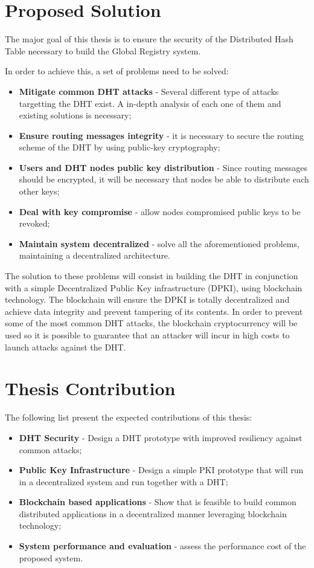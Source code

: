 \section{Proposed Solution}
\label{section:proposed}
The major goal of this thesis is to ensure the security of the Distributed Hash Table necessary to build the Global Registry system.

In order to achieve this, a set of problems need to be solved:
\begin{itemize}
	\item \textbf{Mitigate common DHT attacks} - Several different type of attacks targetting the DHT exist. A in-depth analysis of each one of them and existing solutions is necessary;
	\item \textbf{Ensure routing messages integrity} - it is necessary to secure the routing scheme of the DHT by using public-key cryptography;
	\item \textbf{Users and DHT nodes public key distribution} - Since routing messages should be encrypted, it will be necessary that nodes be able to distribute each other keys;
	\item \textbf{Deal with key compromise} - allow nodes compromised public keys to be revoked;
	\item \textbf{Maintain system decentralized} - solve all the aforementioned problems, maintaining a decentralized architecture.
\end{itemize}

The solution to these problems will consist in building the DHT in conjunction with a simple Decentralized Public Key infrastructure (DPKI), using blockchain technology.
The blockchain will ensure the DPKI is totally decentralized and achieve data integrity and prevent tampering of its contents. In order to prevent some of the most common DHT attacks, the blockchain cryptocurrency will be used so it is possible to guarantee that an attacker will incur in high costs to launch attacks against the DHT.

\section{Thesis Contribution}
\label{section:contribution}
The following list present the expected contributions of this thesis:
\begin{itemize}
	\item \textbf{DHT Security} - Design a DHT prototype with improved resiliency against common attacks;
	\item \textbf{Public Key Infrastructure} - Design a simple PKI prototype that will run in a decentralized system and run together with a DHT;
	\item \textbf{Blockchain based applications} - Show that is feasible to build common distributed applications in a decentralized manner leveraging blockchain technology;
	\item \textbf{System performance and evaluation} - assess the performance cost of the proposed system.
\end{itemize}

